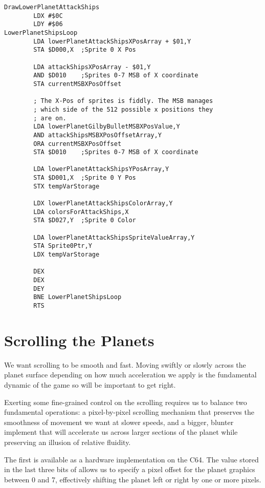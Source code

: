 \begin{minipage}[b]{0.55\linewidth}
\centering
\begin{lstlisting}[basicstyle=\tiny]
DrawLowerPlanetAttackShips
        LDX #$0C
        LDY #$06
LowerPlanetShipsLoop   
        LDA lowerPlanetAttackShipsXPosArray + $01,Y
        STA $D000,X  ;Sprite 0 X Pos

        LDA attackShipsXPosArray - $01,Y
        AND $D010    ;Sprites 0-7 MSB of X coordinate
        STA currentMSBXPosOffset

        ; The X-Pos of sprites is fiddly. The MSB manages
        ; which side of the 512 possible x positions they
        ; are on.
        LDA lowerPlanetGilbyBulletMSBXPosValue,Y
        AND attackShipsMSBXPosOffsetArray,Y
        ORA currentMSBXPosOffset
        STA $D010    ;Sprites 0-7 MSB of X coordinate

        LDA lowerPlanetAttackShipsYPosArray,Y
        STA $D001,X  ;Sprite 0 Y Pos
        STX tempVarStorage

        LDX lowerPlanetAttackShipsColorArray,Y
        LDA colorsForAttackShips,X
        STA $D027,Y  ;Sprite 0 Color

        LDA lowerPlanetAttackShipsSpriteValueArray,Y
        STA Sprite0Ptr,Y
        LDX tempVarStorage

        DEX
        DEX
        DEY
        BNE LowerPlanetShipsLoop
        RTS
\end{lstlisting}
\end{minipage}

\section{Scrolling the Planets}
We want scrolling to be smooth and fast. Moving swiftly or slowly across the planet surface
depending on how much acceleration we apply is the fundamental dynamic of the game so will
be important to get right.

Exerting some fine-grained control on the scrolling requires us to balance
two fundamental operations: a pixel-by-pixel scrolling mechanism that preserves the smoothness
of movement we want at slower speeds, and a bigger, blunter implement that will accelerate
us across larger sections of the planet while preserving an illusion of relative fluidity.

The first is available as a hardware implementation on the C64. The value stored in the last
three bits of  allows us to specify a pixel offset for the planet graphics between
0 and 7, effectively shifting the planet left or right by one or more pixels.

